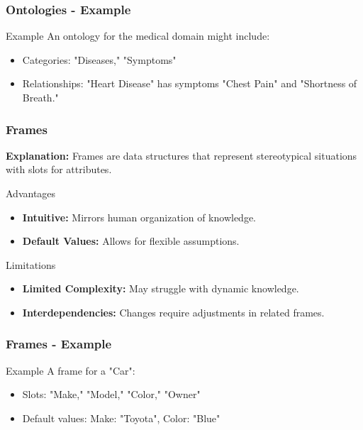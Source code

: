 \documentclass[aspectratio=169]{beamer}
\begin{document}
\begin{frame}[fragile]
    \frametitle{Ontologies - Example}
    \begin{block}{Example}
        An ontology for the medical domain might include:
        \begin{itemize}
            \item Categories: "Diseases," "Symptoms"
            \item Relationships: "Heart Disease" has symptoms "Chest Pain" and "Shortness of Breath."
        \end{itemize}
    \end{block}
\end{frame}

\begin{frame}[fragile]
    \frametitle{Frames}
    \textbf{Explanation:} Frames are data structures that represent stereotypical situations with slots for attributes.

    \begin{block}{Advantages}
        \begin{itemize}
            \item \textbf{Intuitive:} Mirrors human organization of knowledge.
            \item \textbf{Default Values:} Allows for flexible assumptions.
        \end{itemize}
    \end{block}

    \begin{block}{Limitations}
        \begin{itemize}
            \item \textbf{Limited Complexity:} May struggle with dynamic knowledge.
            \item \textbf{Interdependencies:} Changes require adjustments in related frames.
        \end{itemize}
    \end{block}
\end{frame}

\begin{frame}[fragile]
    \frametitle{Frames - Example}
    \begin{block}{Example}
        A frame for a "Car":
        \begin{itemize}
            \item Slots: "Make," "Model," "Color," "Owner"
            \item Default values: Make: "Toyota", Color: "Blue"
        \end{itemize}
    \end{block}
\end{frame}
\end{document}
